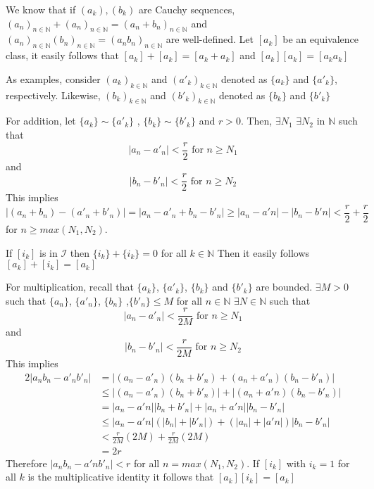 \documentclass{tufte-book}
\theoremstyle{mytheoremstyle}
\theoremstyle{mylemstyle}
\newtheorem*{lem}{Lem.}
\theoremstyle{mydefstyle}
\begin{document}
We know that if $(a_k),(b_k)$ are Cauchy sequences, $(a_n)_{n \in \mathbb{N}} +(a_n)_{n \in \mathbb{N}}=(a_n + b_n)_{n \in \mathbb{N}}$ and $(a_n)_{n \in \mathbb{N}}(b_n)_{n \in \mathbb{N}}=(a_nb_n)_{n \in \mathbb{N}}$ are well-defined.
Let $[a_k]$ be an equivalence class, it easily follows that $[a_k]+[a_k] = [a_k+a_k]$ and $[a_k][a_k] = [a_k a_k]$

As examples, consider $(a_k)_{k \in \mathbb{N}}$ and $(a'_k)_{k \in \mathbb{N}}$ denoted as $\{a_k\}$ and $\{a'_k\}$, respectively. Likewise, $(b_k)_{k \in \mathbb{N}}$ and $(b'_k)_{k \in \mathbb{N}}$ denoted as $\{b_k\}$ and $\{b'_k\}$  

For addition, let $\{a_k\} \sim \{a'_k\}$ , $\{b_k\} \sim \{b'_k\}$ and $r>0$.  Then, $\exists N_1$ $\exists N_2$ in $\mathbb{N}$ such that
\[|a_n-a'_n| < \frac{r}{2} \text{ for } n \geq N_1 \]
and
\[|b_n-b'_n| < \frac{r}{2} \text{ for } n \geq N_2 \]
This implies
\[|(a_n+b_n) - (a'_n + b'_n)| = |a_n - a'_n + b_n - b'_n| \geq |a_n-a'n| - |b_n - b'n| < \frac{r}{2} + \frac{r}{2} \] 
for $n \geq max(N_1,N_2)$.

If $[i_k]$ is in $\mathcal{I}$ then $\{i_k\}+\{i_k\}=0$ for all $k \in \mathbb{N}$ Then it easily follows $[a_k] + [i_k] = [a_k]$

For multiplication, recall that $\{a_k\}$, $\{a'_k\}$, $\{b_k\}$ and $\{b'_k\}$ are bounded. $\exists M >0$ such that  $\{a_n\}$, $\{a'_n\}$, $\{b_n\}$ ,$\{b'_n\} \leq M$ for all $n \in \mathbb{N}$ $\exists N \in \mathbb{N}$ such that
\[|a_n - a'_n| < \frac{r}{2M} \text{ for } n \geq N_1 \]
and
\[|b_n - b'_n| < \frac{r}{2M} \text{ for } n \geq N_2 \]
This implies
\begin{align*}
2|a_nb_n - a'_nb'_n| & = |(a_n-a'_n)(b_n+b'_n) + (a_n+a'_n)(b_n-b'_n)|
\\& \leq |(a_n-a'_n)(b_n+b'_n)| + |(a_n+a'n)(b_n-b'_n)|
\\& = |a_n-a'n||b_n+b'_n| + |a_n+a'n||b_n-b'_n|
\\& \leq |a_n-a'n|(|b_n|+|b'_n|) + (|a_n|+|a'n|)|b_n-b'_n|
\\& < \frac{r}{2M}(2M) + \frac{r}{2M}(2M)
\\& = 2r
\end{align*}
Therefore $|a_nb_n - a'nb'_n| < r$ for all $n = max(N_1,N_2)$.  If $[i_k]$  with $i_k=1$ for all $k$ is the multiplicative identity it follows that $[a_k][i_k] = [a_k]$
\end{document}
